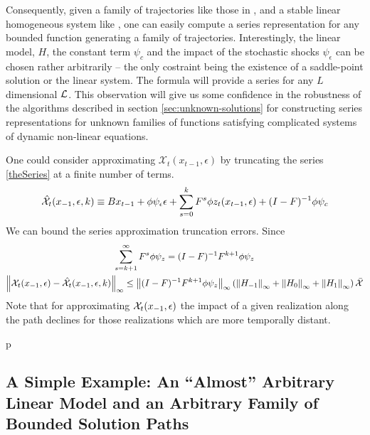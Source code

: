 \documentclass[12pt]{article}
\begin{document}
	 Consequently, given a family of trajectories like those in ,
and a stable linear homogeneous system like ,
one can easily compute a series 
representation  for any  bounded function generating a family of
trajectories.
Interestingly, the linear model, $H$, the  constant term $\psi_c$ and the
impact of the stochastic shocks $\psi_\epsilon $ can  be 
chosen rather arbitrarily -- the only costraint being the existence of a saddle-point solution or the linear system.  
The formula will provide a series  for any 
$L$ dimensional ${\mathcal{L}}$.
This observation will give us some confidence in the 
robustness of the algorithms described in section 
\ref{sec:unknown-solutions} for constructing series 
representations for unknown families of functions 
satisfying complicated systems of dynamic non-linear equations.



One could consider approximating $\mathcal{X}_t(x_{t-1},\epsilon)$ by 
truncating the series \ref{theSeries} at a finite number of terms.
 	 \begin{gather}
 	 \hat{\mathcal{X}}_{t}(x_{-1},\epsilon,k) \equiv B x_{t-1}+ \phi \psi_\epsilon\epsilon + \sum_{s=0}^k F^s \phi z_{t}(x_{t-1},\epsilon) + (I - F)^{-1} \phi \psi_c \label{theTruncSeries}
 \end{gather}
We can bound the  series approximation truncation errors.
Since
    \begin{gather}
      \label{eq:1}
\sum_{s=k+1}^{\infty} F^s \phi \psi_z = (I -F)^{-1} F^{k+1}\phi \psi_z       \\
\left\lVert\mathcal{X}_{t}(x_{-1},\epsilon)-\hat{\mathcal{X}}_{t}(x_{-1},\epsilon,k)\right\rVert_\infty \le \left\lVert(I -F)^{-1} F^{k+1}\phi \psi_z\right\rVert_\infty \left ( \left\lVert H_{-1} \right\rVert_\infty+ \left\lVert H_{0} \right\rVert_\infty+ \left\lVert H_{1} \right\rVert_\infty \right )\bar{\mathcal{X}}
    \end{gather}
Note that for approximating $\mathcal{X}_{t}(x_{-1},\epsilon)$ the impact of  a given realization along the path declines for those realizations which are  more temporally distant.

p


\subsection{A Simple Example: An ``Almost'' Arbitrary Linear Model and an Arbitrary Family of Bounded Solution Paths}
\label{sec:almostarbitrary}
\end{document}
